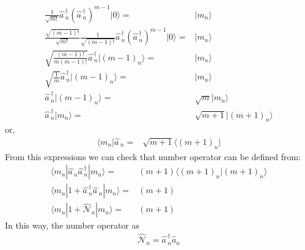 \begin{frame}
\begin{align}
\frac{1}{\sqrt{m!}} \widehat{a\,}_{n}^\dagger\left(\widehat{a\,}_{n}^\dagger\right)^{m-1} |0\rangle=&|m_n\rangle\nonumber\\
\frac{\sqrt{(m-1)!}}{\sqrt{m!}}\frac{1}{\sqrt{(m-1)!}} \widehat{a\,}_{n}^\dagger\left(\widehat{a\,}_{n}^\dagger\right)^{m-1} |0\rangle=&|m_n\rangle\nonumber\\
\sqrt{\frac{(m-1)!}{m(m-1)!}} \widehat{a\,}_{n}^\dagger|(m-1)_n\rangle=&|m_n\rangle\nonumber\\
\sqrt{\frac{1}{m}} \widehat{a\,}_{n}^\dagger|(m-1)_n\rangle=&|m_n\rangle\nonumber\\
 \widehat{a\,}_{n}^\dagger|(m-1)_n\rangle=&\sqrt{m}|m_n\rangle\nonumber\\
 \widehat{a\,}_{n}^\dagger|m_n\rangle=&\sqrt{m+1}|(m+1)_n\rangle
\end{align}
or,
\begin{align}
  \langle m_n|\widehat{a\,}_{n}=&\sqrt{m+1}\langle(m+1)_n|
\end{align}
From this expressions we can check that number operator can be defined from:
\begin{align}
 \langle m_n|\widehat{a\,}_{n}  \widehat{a\,}_{n}^\dagger|m_n\rangle=&(m+1)\langle(m+1)_n|(m+1)_n\rangle\nonumber\\
 \langle m_n|1+\widehat{a\,}_{n}^\dagger\widehat{a\,}_{n} |m_n\rangle=&(m+1)\nonumber\\
 \langle m_n|1+\widehat{\mathcal{N}}_n |m_n\rangle=&(m+1)
\end{align}
In this way, the number operator as
\begin{align}
  \widehat{\mathcal{N}}_n=\widehat{a\,}_{n}^\dagger\widehat{a}_{n}
\end{align}



\end{frame}
